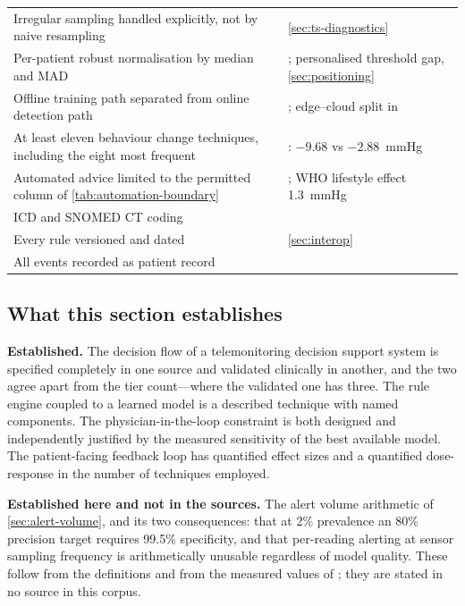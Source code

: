\documentclass[12pt,a4paper,oneside]{report}
\begin{document}
\begin{table}[htbp]
\begin{tabularx}{\textwidth}{@{}X >{\raggedright\arraybackslash}p{5.9cm}@{}}
Irregular sampling handled explicitly, not by naive resampling & \cref{sec:ts-diagnostics} \\
Per-patient robust normalisation by median and MAD & \textcite{liu2025review}; personalised threshold gap, \cref{sec:positioning} \\
Offline training path separated from online detection path & \textcite{liu2025review}; edge--cloud split in \textcite{mucchi2021} \\
At least eleven behaviour change techniques, including the eight most frequent & \textcite{zhou2024}: $-9.68$ vs $-2.88$~mmHg \\
Automated advice limited to the permitted column of \cref{tab:automation-boundary} & \textcite{mendoza2025}; WHO lifestyle effect 1.3~mmHg \\
ICD and SNOMED CT coding & \textcite{liu2025review} \\
Every rule versioned and dated & \cref{sec:interop} \\
All events recorded as patient record & \textcite{yazdani2018} \\
\bottomrule
\end{tabularx}
\end{table}

\subsection{What this section establishes}\label{sec:cdss-conclusion}

\textbf{Established.} The decision flow of a telemonitoring decision support system is specified completely in one source and validated clinically in another, and the two agree apart from the tier count---where the validated one has three. The rule engine coupled to a learned model is a described technique with named components. The physician-in-the-loop constraint is both designed and independently justified by the measured sensitivity of the best available model. The patient-facing feedback loop has quantified effect sizes and a quantified dose-response in the number of techniques employed.

\textbf{Established here and not in the sources.} The alert volume arithmetic of \cref{sec:alert-volume}, and its two consequences: that at 2\% prevalence an 80\% precision target requires 99.5\% specificity, and that per-reading alerting at sensor sampling frequency is arithmetically unusable regardless of model quality. These follow from the definitions and from the measured values of \textcite{mendoza2025}; they are stated in no source in this corpus.
\end{document}
